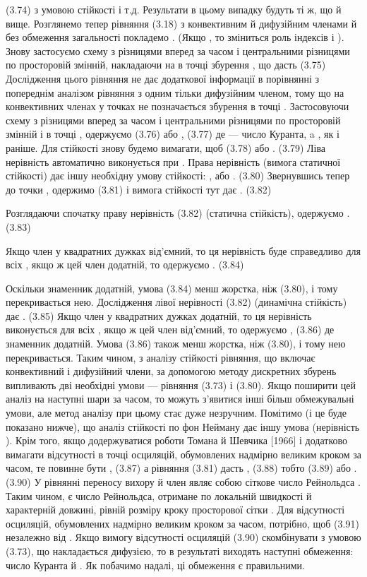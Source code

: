   	(3.74)
 з умовою стійкості   і т.д. Результати в цьому випадку будуть ті ж, що й вище.
Розглянемо тепер рівняння (3.18) з конвективним й дифузійним членами й без обмеження загальності покладемо  . (Якщо , то зміниться роль індексів   і  ). Знову застосуємо схему з різницями вперед за часом і центральними різницями по просторовій змінній, накладаючи на   в точці   збурення , що дасть
  	(3.75)
Дослідження цього рівняння не дає додаткової інформації в порівнянні з попереднім аналізом рівняння з одним тільки дифузійним членом, тому що на конвективних членах у точках   не позначається збурення в точці  . Застосовуючи схему з різницями вперед за часом і центральними різницями по просторовій змінній і в точці , одержуємо
  	(3.76)
або
 , 	(3.77)
де   — число Куранта, a , як і раніше. Для стійкості знову будемо вимагати, щоб
  	(3.78)
або
 . 	(3.79)
Ліва нерівність автоматично виконується при  . Права нерівність (вимога статичної стійкості) дає іншу необхідну умову стійкості:
 , 
або
  .	(3.80)
Звернувшись тепер до точки  , одержимо
  	(3.81)
і вимога стійкості   тут дає
 . 	(3.82)

Розглядаючи спочатку праву нерівність (3.82) (статична стійкість), одержуємо
 . 	(3.83)

Якщо член у квадратних дужках від'ємний, то ця нерівність буде справедливо для всіх  , якщо ж цей член додатній, то одержуємо
 . 	(3.84)

Оскільки знаменник додатній, умова (3.84) менш жорстка, ніж (3.80), і тому перекривається нею.
Дослідження лівої нерівності (3.82) (динамічна стійкість) дає
 . 	(3.85)
Якщо член у квадратних дужках додатній, то ця нерівність виконується для всіх  , якщо ж цей член від'ємний, то одержуємо
 ,	(3.86)
де знаменник додатній. Умова (3.86) також менш жорстка, ніж (3.80), і тому нею перекривається.
Таким чином, з аналізу стійкості рівняння, що включає конвективний і дифузійний члени, за допомогою методу дискретних збурень випливають дві необхідні умови — рівняння (3.73) і (3.80). Якщо поширити цей аналіз на наступні шари за часом, то можуть з'явитися інші більш обмежувальні умови, але метод аналізу при цьому стає дуже незручним. Помітимо (і це буде показано нижче), що аналіз стійкості по фон Нейману дає іншу умова (нерівність  ).
Крім того, якщо додержуватися роботи Томана й Шевчика [1966] і додатково вимагати відсутності в точці   осциляцій, обумовлених надмірно великим  кроком за часом, те повинне бути
 , 	(3.87)
а рівняння (3.81) дасть
 , 	(3.88)
тобто
  	(3.89)
або
 . 	(3.90)
У рівнянні переносу вихору   й член   являє собою сіткове число Рейнольдса   . Таким чином,   є число Рейнольдса, отримане по локальній швидкості й характерній довжині, рівній розміру кроку просторової сітки  . Для відсутності осциляцій, обумовлених надмірно великим кроком за часом, потрібно, щоб
 	(3.91)
незалежно від  . Якщо вимогу відсутності осциляцій (3.90) скомбінувати з умовою (3.73), що накладається дифузією, то в результаті виходять наступні обмеження: число Куранта   й  . Як побачимо надалі, ці обмеження є правильними.


